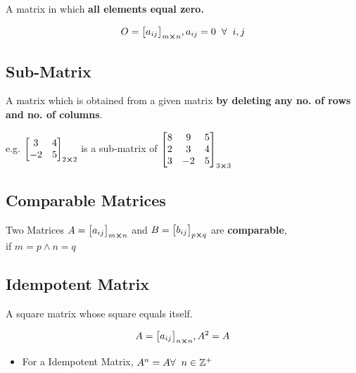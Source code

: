 \documentclass{article}
\begin{document}
A matrix in which \textbf{all elements equal zero.}

$$O={\begin{bmatrix}
        a_{ij}
    \end{bmatrix}}_{m \cross n}, a_{ij}=0 \hspace{2mm} \forall \hspace{2mm} i,j $$

\subsection{Sub-Matrix}

A matrix which is obtained from a given matrix \textbf{by deleting any no. of rows and no. of columns}.

e.g. ${\begin{bmatrix}
                3  & 4 \\
                -2 & 5
            \end{bmatrix}}_{2 \cross 2}$ is a sub-matrix of ${\begin{bmatrix}
                8 & 9  & 5 \\
                2 & 3  & 4 \\
                3 & -2 & 5
            \end{bmatrix}}_{3 \cross 3} $

\subsection{Comparable Matrices}

Two Matrices $A={\begin{bmatrix}
        a_{ij}
    \end{bmatrix}}_{m \cross n} $ and $B= {\begin{bmatrix}
        b_{ij}
    \end{bmatrix}}_{p \cross q} $ are \textbf{comparable}, \\if \textbf{$m=p \wedge n = q$}


\subsection{Idempotent Matrix}

A square matrix whose square equals itself.

$$A={\begin{bmatrix}
        a_{ij}
    \end{bmatrix}}_{n \cross n}, A^2=A $$

\begin{itemize}

    \item   For a Idempotent Matrix, $A^n=A \hfill \forall \hspace{2mm} n \in \mathbb{Z^+}$
\end{itemize}
\end{document}
